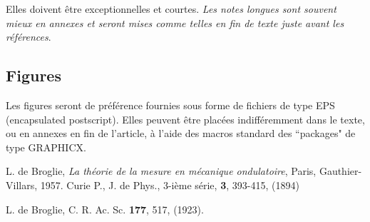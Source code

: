\documentclass[10pt,twoside,a5paper]{article}
\begin{document}
Elles doivent \^etre exceptionnelles et courtes. {\it Les notes longues sont
souvent mieux en annexes et seront mises comme telles en fin de texte juste avant
les r\'ef\'erences}.

\subsection{Figures}

Les figures seront de pr\'ef\'erence fournies sous forme de fichiers de type EPS
(encapsulated postscript). Elles peuvent \^etre plac\'ees indiff\'eremment dans le
texte, ou en annexes en fin de l'article, \`a l'aide des macros standard des
``packages" de type GRAPHICX.



\vskip 30pt
\begin{frenchref}
\bibitem{} L. de Broglie, {\it La th\'eorie de la mesure en m\'ecanique
ondulatoire}, Paris, Gauthier-Villars, 1957.
\bibitem{}Curie P., J. de Phys., 3-i\`eme s\'erie, {\bf 3}, 393-415, (1894)

 L. de Broglie, C. R. Ac. Sc.  {\bf 177}, 517, (1923).
\end{frenchref}

\end{document}
